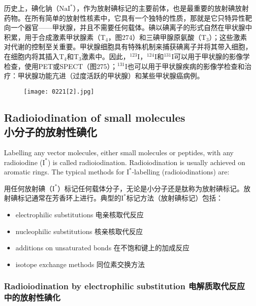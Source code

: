 \documentclass[dvipsnames, svgnames,a4paper,11pt]{article}
\begin{document}
历史上，碘化钠（\(\mathrm{NaI^*}\)），作为放射碘标记的主要前体，也是最重要的放射碘放射药物。在所有简单的放射性核素中，它具有一个独特的性质，那就是它只特异性靶向一个器官——甲状腺，并且不需要任何载体。碘以碘离子的形式自然在甲状腺中积累，用于合成激素甲状腺素（T${}_4$，图274）和三碘甲腺原氨酸（T${}_3$）；这些激素对代谢的控制至关重要。甲状腺细胞具有特殊机制来捕获碘离子并将其带入细胞，在细胞内将其插入T${}_4$和T${}_3$激素中。因此，\(\mathrm{^{123}I}\)，\(\mathrm{^{124}I}\)和\(\mathrm{^{131}I}\)可以用于甲状腺的影像学检查，使用PET或SPECT（图275）；\(\mathrm{^{131}I}\)也可以用于甲状腺疾病的影像学检查和治疗：甲状腺功能亢进（过度活跃的甲状腺）和某些甲状腺癌病例。  

\begin{figure}[h]
	\centering
    \texttt{[image: 0221[2].jpg]}  
     \label{fig275}
\end{figure}


\subsection{Radioiodination of small molecules\\ 小分子的放射性碘化}  
Labelling any vector molecules, either small molecules or peptides, with any radioiodine (\(\mathrm{I^*}\)) is called radioiodination. Radioiodination is usually achieved on aromatic rings. The typical methods for \(\mathrm{I^*}\)-labelling (radioiodinations) are:  

用任何放射碘（\(\mathrm{I^*}\)）标记任何载体分子，无论是小分子还是肽称为放射碘标记。放射碘标记通常在芳香环上进行。典型的\(\mathrm{I^*}\)标记方法（放射碘标记）包括：  

\begin{itemize}  
  \item electrophilic substitutions    电亲核取代反应 
  \item nucleophilic substitutions   核亲核取代反应  
  \item additions on unsaturated bonds   在不饱和键上的加成反应
  \item isotope exchange methods  同位素交换方法
\end{itemize}


\subsubsection{Radioiodination by electrophilic substitution 电解质取代反应中的放射性碘化}  
\end{document}
